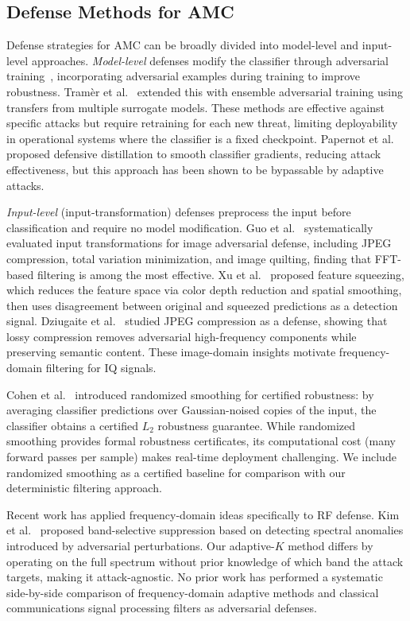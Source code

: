 \subsection{Defense Methods for AMC}

Defense strategies for AMC can be broadly divided into model-level and
input-level approaches. \emph{Model-level} defenses modify the classifier
through adversarial training~\cite{madry2018towards}, incorporating adversarial
examples during training to improve robustness. Tram\`{e}r et
al.~\cite{tramer2017ensemble} extended this with ensemble adversarial training
using transfers from multiple surrogate models. These methods are effective
against specific attacks but require retraining for each new threat, limiting
deployability in operational systems where the classifier is a fixed checkpoint.
Papernot et al.~\cite{papernot2016distillation} proposed defensive distillation
to smooth classifier gradients, reducing attack effectiveness, but this approach
has been shown to be bypassable by adaptive attacks.

\emph{Input-level} (input-transformation) defenses preprocess the input before
classification and require no model modification. Guo et al.~\cite{guo2018input}
systematically evaluated input transformations for image adversarial defense,
including JPEG compression, total variation minimization, and image
quilting, finding that FFT-based filtering is among the most effective.
Xu et al.~\cite{xu2018feature} proposed feature squeezing, which reduces
the feature space via color depth reduction and spatial smoothing, then
uses disagreement between original and squeezed predictions as a detection
signal. Dziugaite et al.~\cite{dziugaite2016compression} studied JPEG
compression as a defense, showing that lossy compression removes adversarial
high-frequency components while preserving semantic content. These image-domain
insights motivate frequency-domain filtering for IQ signals.

Cohen et al.~\cite{cohen2019certified} introduced randomized smoothing for
certified robustness: by averaging classifier predictions over Gaussian-noised
copies of the input, the classifier obtains a certified $L_2$ robustness
guarantee. While randomized smoothing provides formal robustness certificates,
its computational cost (many forward passes per sample) makes real-time
deployment challenging. We include randomized smoothing as a certified baseline
for comparison with our deterministic filtering approach.

Recent work has applied frequency-domain ideas specifically to RF defense.
Kim et al.~\cite{kim2024frequency} proposed band-selective suppression
based on detecting spectral anomalies introduced by adversarial perturbations.
Our adaptive-$K$ method differs by operating on the full spectrum without
prior knowledge of which band the attack targets, making it attack-agnostic.
No prior work has performed a systematic side-by-side comparison of
frequency-domain adaptive methods and classical communications signal processing
filters as adversarial defenses.

